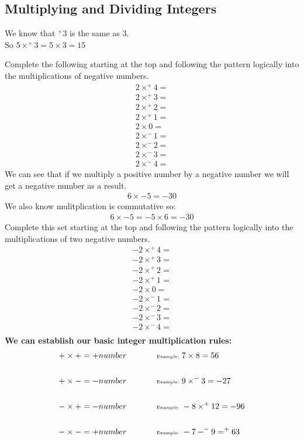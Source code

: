 \documentclass[a4paper,12pt]{article}
\begin{document}
\subsection{Multiplying and Dividing Integers}
\begin{onehalfspace}
We know that $^{+}3$ is the same as 3.\\
So $5\times^{+}3=5\times 3=15$\\
\end{onehalfspace}
Complete the following starting at the top and following the pattern logically into the multiplications of negative numbers.
\begin{align*}
2\times ^{+}4=\\
2\times ^{+}3=\\
2\times ^{+}2=\\
2\times ^{+}1=\\
2\times 0=\\
2\times ^{-}1=\\
2\times ^{-}2=\\
2\times ^{-}3=\\
2\times ^{-}4=
\end{align*}
We can see that if we multiply a positive number by a negative number we will get a negative number as a result.
\begin{align*}
6\times-5=-30
\end{align*}
We also know mulitplication is commutative so: 
\begin{align*}
6\times -5=-5\times 6=-30
\end{align*}
Complete this set starting at the top and following the pattern logically into the multiplications of two negative numbers.
\begin{align*}
-2\times ^{+}4=\\
-2\times ^{+}3=\\
-2\times ^{+}2=\\
-2\times ^{+}1=\\
-2\times 0=\\
-2\times ^{-}1=\\
-2\times ^{-}2=\\
-2\times ^{-}3=\\
-2\times ^{-}4=\\
\end{align*}
\textbf{We can establish our basic integer multiplication rules:}
\begin{align*}
+\times +&= + number~~~~~~~~~~~\text{\tiny Example: }7\times 8 =56\\\\
+\times -&= - number~~~~~~~~~~~\text{\tiny Example: } 9\times ^{-}3=-27\\\\
-\times +&= - number~~~~~~~~~~~\text{\tiny Example: } -8\times ^{+}12=-96\\\\
-\times -&= + number~~~~~~~~~~~\text{\tiny Example: } -7-^{-}9=^{+}63\\\\
\end{align*} 
\end{document}

